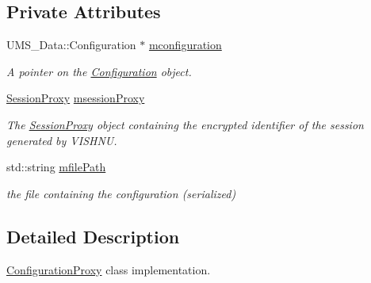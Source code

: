\subsection*{Private Attributes}
\begin{DoxyCompactItemize}
\item 
\hypertarget{classConfigurationProxy_a2a3f4f27565b9f8fe37632b09b3c3ac0}{
UMS\_\-Data::Configuration $\ast$ \hyperlink{classConfigurationProxy_a2a3f4f27565b9f8fe37632b09b3c3ac0}{mconfiguration}}
\label{classConfigurationProxy_a2a3f4f27565b9f8fe37632b09b3c3ac0}

\begin{DoxyCompactList}\small\item\em A pointer on the \hyperlink{classConfiguration}{Configuration} object. \item\end{DoxyCompactList}\item 
\hypertarget{classConfigurationProxy_a6a9b99ddf54b3912174ed253374d72f6}{
\hyperlink{classSessionProxy}{SessionProxy} \hyperlink{classConfigurationProxy_a6a9b99ddf54b3912174ed253374d72f6}{msessionProxy}}
\label{classConfigurationProxy_a6a9b99ddf54b3912174ed253374d72f6}

\begin{DoxyCompactList}\small\item\em The \hyperlink{classSessionProxy}{SessionProxy} object containing the encrypted identifier of the session generated by VISHNU. \item\end{DoxyCompactList}\item 
\hypertarget{classConfigurationProxy_adf6e46f39a26757595323122b002c8b0}{
std::string \hyperlink{classConfigurationProxy_adf6e46f39a26757595323122b002c8b0}{mfilePath}}
\label{classConfigurationProxy_adf6e46f39a26757595323122b002c8b0}

\begin{DoxyCompactList}\small\item\em the file containing the configuration (serialized) \item\end{DoxyCompactList}\end{DoxyCompactItemize}


\subsection{Detailed Description}
\hyperlink{classConfigurationProxy}{ConfigurationProxy} class implementation. 

